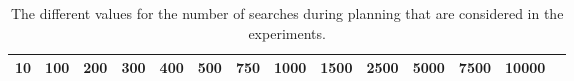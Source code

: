 \begin{table}[htbp]
\footnotesize
\centering
\centerfloat
\setlength{\tabcolsep}{5pt}
\begin{tabular}{cccccccccccccc}
\toprule
10 & 100 & 200 & 300 & 400 & 500 & 750 & 1000 & 1500 & 2500 & 5000 & 7500 & 10000 \\ \bottomrule
\end{tabular}
\caption[Number of searches during planning considered in the experiments]{The different values for the number of searches during planning that are considered in the experiments.}
\label{tab:num_searches}
\end{table} 